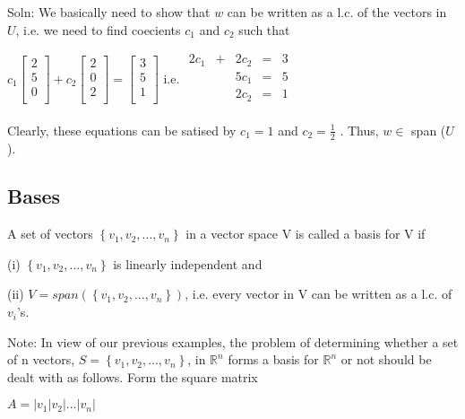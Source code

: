 \documentclass{extarticle}
\begin{document}
\begin{multicols}{4}
\begin{tcolorbox}[enhanced jigsaw,sharp corners,coltext=black,colback=BurntOrange!25!white,boxrule=0pt,breakable,size=minimal]
Soln: We basically need to show that $w$ can be written as a l.c. of the vectors in $U$, i.e. we need to find coecients $c_1$ and $c_2$ such that

$c_1 \left[ \begin{matrix}2\\5\\0\\\end{matrix} \right] + c_2 \left[ \begin{matrix}2\\0\\2\\\end{matrix} \right] = \left[ \begin{matrix}3\\5\\1\\\end{matrix} \right]$
i.e.
$\begin{matrix} 2c_1&+&2c_2&=&3\\&&5c_1&=&5\\&&2c_2&=&1\\ \end{matrix}$

Clearly, these equations can be satised by $c_1 = 1$ and $c_2 = \frac{1}{2}$ . Thus, $w \in$ span ($U$).

\end{tcolorbox}

\begin{tcolorbox}[enhanced jigsaw,sharp corners,coltext=black,colback=BurntOrange!25!white,boxrule=0pt,breakable,size=minimal]

\subsection{Bases}
A set of vectors $\left\{v_1,v_2,...,v_n\right\}$ in a vector space V is called a basis for V if

(i) $\left\{v_1,v_2,...,v_n\right\}$ is linearly independent and 

(ii) $V=span(\left\{v_1,v_2,...,v_n\right\})$, i.e. every vector in V can be written as a l.c. of $v_i$'s.

Note: In view of our previous examples, the problem of determining whether a set of n vectors, $S = \left\{v_1,v_2,...,v_n\right\}$, in ${\mathbb{R}}^n$ forms a basis for ${\mathbb{R}}^n$ or not should be dealt with as follows. Form the square matrix

$A = \left|v_1|v_2|...|v_n\right|$


\end{tcolorbox}
\end{multicols}
\end{document}
